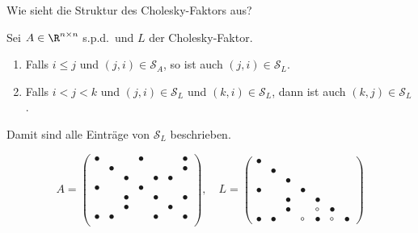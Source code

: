 Wie sieht die Struktur des Cholesky-Faktors aus?
\begin{satz}
\label{thm:structure_of_cholesky_factor}
Sei $A \in \R^{n \times n}$ s.p.d.\ und $L$ der Cholesky-Faktor.
\begin{enumerate}
 \item Falls $i \leq j$ und $(j,i) \in \mathcal{S}_A$, so ist auch $(j,i) \in \mathcal{S}_L$.
 \item Falls $i<j<k$ und $(j,i) \in \mathcal{S}_L$ und $(k,i) \in \mathcal{S}_L$, dann ist auch $(k,j) \in \mathcal{S}_L$.
\end{enumerate}
Damit sind alle Einträge von $\mathcal{S}_L$ beschrieben.
\end{satz}
\begin{bsp}
\begin{equation*}
	A=\begin{pmatrix}
		\bullet & & & \bullet & & & \bullet \\
		& \bullet & & & & & \bullet \\
		& & \bullet & & \bullet & \bullet & \\
		\bullet & & & \bullet & & & \\
		& & \bullet & & \bullet & & \bullet \\
		& & \bullet & & & \bullet & \\
		\bullet & \bullet & & & \bullet & & \bullet\\
	\end{pmatrix}, \quad L=\begin{pmatrix}
		\bullet & & & & & & \\
		& \bullet & & & & & \\
		& & \bullet & & & & \\
		\bullet & & & \bullet & & & \\
		& & \bullet & & \bullet & & \\
		& & \bullet & & \circ & \bullet & \\
		\bullet & \bullet & & \circ & \bullet & \circ & \bullet
	\end{pmatrix}
\end{equation*}
\end{bsp}
